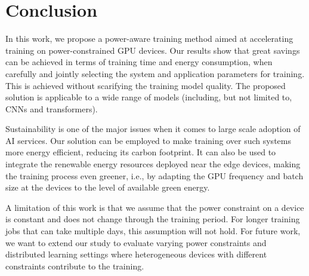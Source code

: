 \section{Conclusion}
In this work, we propose a power-aware training method aimed at accelerating training on power-constrained GPU devices. Our results show that great savings can be achieved in terms of training time and energy consumption, when carefully and jointly selecting the system and application parameters for training. This is achieved without scarifying the training model quality. 
The proposed solution is applicable to a wide range of models (including, but not limited to, CNNs and transformers). 


Sustainability is one of the major issues when it comes to large scale adoption of AI services. Our solution can be employed to make training over such systems more energy efficient, reducing its carbon footprint. It can also be used to integrate the renewable energy resources deployed near the edge devices, making the training process even greener, i.e., by adapting the GPU frequency and batch size at the devices to the level of available green energy. 

A limitation of this work is that we assume that the power constraint on a device is constant and does not change through the training period. For longer training jobs that can take multiple days, this assumption will not hold. For future work, we want to extend our study to evaluate varying power constraints and distributed learning settings where heterogeneous devices with different constraints contribute to the training.